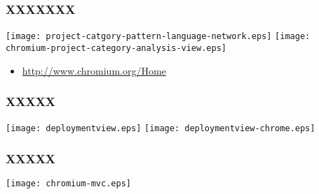 \documentclass[utf8x]{beamer}
\begin{document}
\begin{frame}%
\frametitle{XXXXXXX}
\texttt{[image: project-catgory-pattern-language-network.eps]}
\texttt{[image: chromium-project-category-analysis-view.eps]}
\begin{itemize}
\fontsize{8pt}{8pt}\selectfont
\item[\dag] \url{http://www.chromium.org/Home}
\end{itemize}
\end{frame}

\begin{frame}
\frametitle{XXXXX}
\texttt{[image: deploymentview.eps]}
\texttt{[image: deploymentview-chrome.eps]}
\end{frame}

\begin{frame}%
\frametitle{XXXXX}
\begin{center}
\texttt{[image: chromium-mvc.eps]}
\end{center}
\end{frame}

\end{document}
